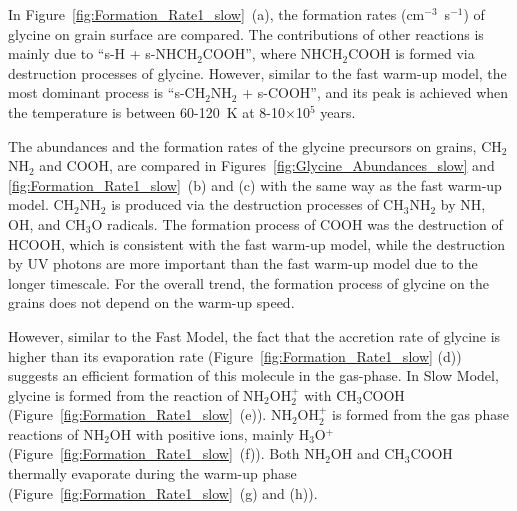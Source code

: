 \documentclass{aastex61}
\begin{document}
In Figure~\ref{fig:Formation_Rate1_slow}~(a), the formation rates (cm$^{-3}$~s$^{-1}$) of glycine on grain surface are compared.
%
The contributions of other reactions is mainly due to ``s-H + s-NHCH$_2$COOH'', where NHCH$_2$COOH is formed via destruction processes of glycine.
%
However, similar to the fast warm-up model, the most dominant process is ``s-CH$_2$NH$_2$ + s-COOH'', and its peak is achieved when the temperature is between 60-120~K at 8-10$\times$10$^{5}$ years.
%

The abundances and the formation rates of the glycine precursors on grains, CH$_2$NH$_2$ and COOH, are compared in Figures~\ref{fig:Glycine_Abundances_slow} and \ref{fig:Formation_Rate1_slow}~(b) and (c) with the same way as the fast warm-up model.
%
CH$_2$NH$_2$ is produced via the destruction processes of CH$_3$NH$_2$ by NH, OH, and CH$_3$O radicals.
%
The formation process of COOH was the destruction of HCOOH, which is consistent with the fast warm-up model, while the destruction by UV photons are more important than the fast warm-up model due to the longer timescale.
%
For the overall trend, the formation process of glycine on the grains does not depend on the warm-up speed.

However, similar to the Fast Model, the fact that the accretion rate of glycine is higher than its evaporation rate (Figure~\ref{fig:Formation_Rate1_slow} (d)) suggests an efficient formation of this molecule in the gas-phase.
%
In Slow Model, glycine is formed from the reaction of NH$_2$OH$_2^+$ with CH$_3$COOH (Figure~\ref{fig:Formation_Rate1_slow}~(e)).
%
NH$_2$OH$_2^+$ is formed from the gas phase reactions of NH$_2$OH with positive ions, mainly H$_3$O$^+$ (Figure~\ref{fig:Formation_Rate1_slow}~(f)).
%
Both NH$_2$OH and CH$_3$COOH thermally evaporate during the warm-up phase (Figure~\ref{fig:Formation_Rate1_slow}~(g) and (h)).
\end{document}
